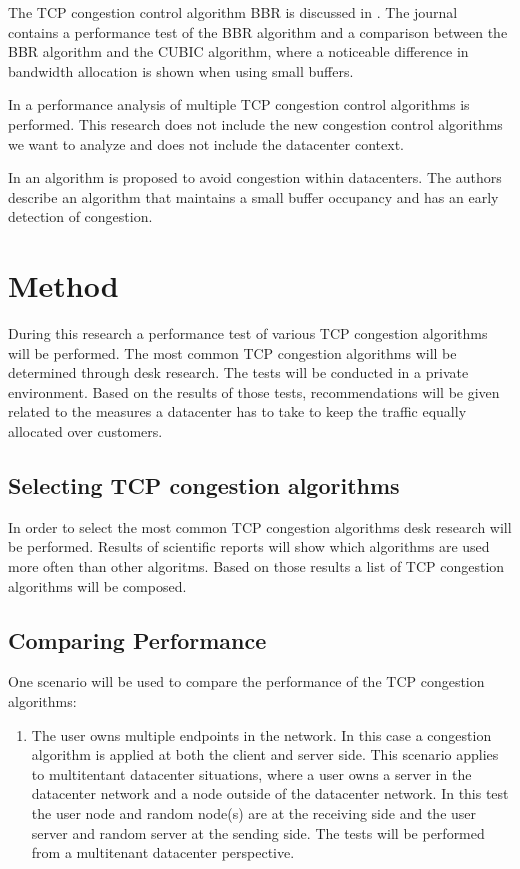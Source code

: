 \documentclass{article}
\begin{document}
The TCP congestion control algorithm BBR is discussed in \cite{bbr-congestion}.
The journal contains a performance test of the BBR algorithm and a comparison
between the BBR algorithm and the CUBIC algorithm, where a noticeable
difference in bandwidth allocation is shown when using small buffers.

In \cite{multiple-congestion} a performance analysis of multiple TCP congestion
control algorithms is performed. This research does not include the new
congestion control algorithms we want to analyze and does not include the
datacenter context.

In \cite{dctcp-congestion-original} an algorithm is proposed to avoid
congestion within datacenters. The authors describe an algorithm that maintains
a small buffer occupancy and has an early detection of congestion.

\section{Method}
During this research a performance test of various TCP congestion algorithms will be performed. The most common TCP congestion algorithms will be determined through desk research. The tests will be conducted in a private environment. Based on the results of those tests, recommendations will be given related to the measures a datacenter has to take to keep the traffic equally allocated over customers. 

	\subsection{Selecting TCP congestion algorithms}	
	In order to select the most common TCP congestion algorithms desk research will be performed. Results of scientific reports will show which algorithms are used more often than other algoritms. Based on those results a list of TCP congestion algorithms will be composed.	
	
	\subsection{Comparing Performance}
	One scenario will be used to compare the performance of the TCP congestion algorithms:
	\begin{enumerate}
		\item The user owns multiple endpoints in the network. In this case a congestion algorithm is applied at both the client and server side. This scenario applies to multitentant datacenter situations, where a user owns a server in the datacenter network and a node outside of the datacenter network. In this test the user node and random node(s) are at the receiving side and the user server and random server at the sending side. The tests will be performed from a multitenant datacenter perspective.
	\end{enumerate}
	
\end{document}
